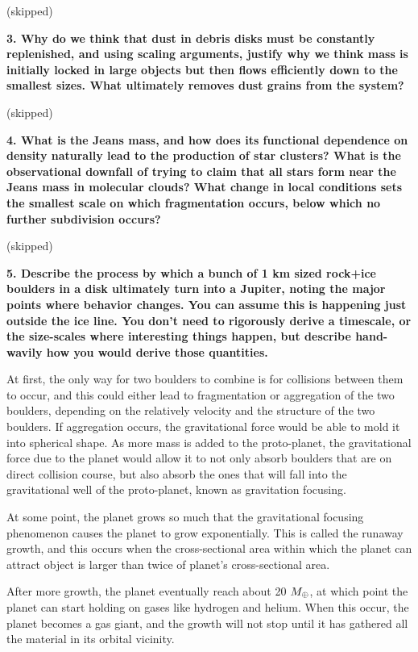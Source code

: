 \documentclass[12pt,preprint]{aastex61}
\begin{document}
(skipped)

{\bf 3. Why do we think that dust in debris disks must be constantly replenished, and using scaling arguments, justify why we think mass is initially locked in large objects but then flows efficiently down to the smallest sizes. What ultimately removes dust grains from the system?}

(skipped)

{\bf 4. What is the Jeans mass, and how does its functional dependence on density naturally lead to the production of star clusters? What is the observational downfall of trying to claim that all stars form near the Jeans mass in molecular clouds? What change in local conditions sets the smallest scale on which fragmentation occurs, below which no further subdivision occurs?}

(skipped)

{\bf 5. Describe the process by which a bunch of 1 km sized rock+ice boulders in a disk ultimately turn into a Jupiter, noting the major points where behavior changes. You can assume this is happening just outside the ice line. You don't need to rigorously derive a timescale, or the size-scales where interesting things happen, but describe hand-wavily how you would derive those quantities.}

At first, the only way for two boulders to combine is for collisions between them to occur, and this could either lead to fragmentation or aggregation of the two boulders, depending on the relatively velocity and the structure of the two boulders. If aggregation occurs, the gravitational force would be able to mold it into spherical shape. As more mass is added to the proto-planet, the gravitational force due to the planet would allow it to not only absorb boulders that are on direct collision course, but also absorb the ones that will fall into the gravitational well of the proto-planet, known as gravitation focusing. 

At some point, the planet grows so much that the gravitational focusing phenomenon causes the planet to grow exponentially. This is called the runaway growth, and this occurs when the cross-sectional area within which the planet can attract object is larger than twice of planet's cross-sectional area. 

After more growth, the planet eventually reach about 20 $M_\oplus$, at which point the planet can start holding on gases like hydrogen and helium. When this occur, the planet becomes a gas giant, and the growth will not stop until it has gathered all the material in its orbital vicinity.
\end{document}
